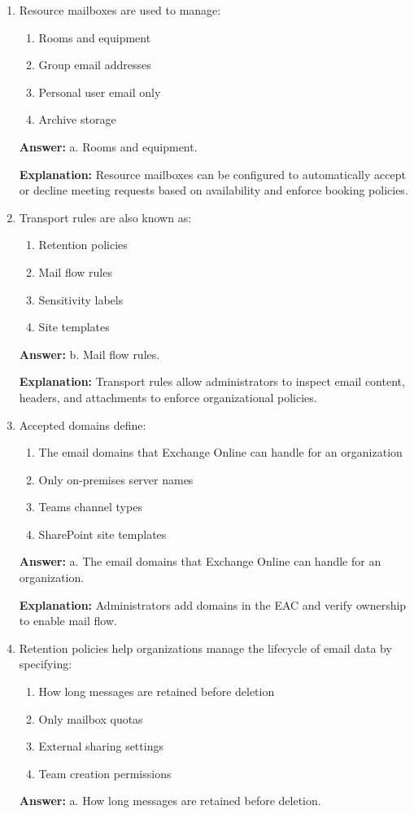 \documentclass[10pt]{article}
\begin{document}
\begin{enumerate}[leftmargin=*]
\textbf{Explanation:} Examples include support@contoso.com or info@contoso.com. These mailboxes don’t require a separate license unless accessed with mobile devices.

\item Resource mailboxes are used to manage:
\begin{enumerate}[label=\alph*., leftmargin=1.5em]
\item Rooms and equipment
\item Group email addresses
\item Personal user email only
\item Archive storage
\end{enumerate}
\textbf{Answer:} a. Rooms and equipment.

\textbf{Explanation:} Resource mailboxes can be configured to automatically accept or decline meeting requests based on availability and enforce booking policies.

\item Transport rules are also known as:
\begin{enumerate}[label=\alph*., leftmargin=1.5em]
\item Retention policies
\item Mail flow rules
\item Sensitivity labels
\item Site templates
\end{enumerate}
\textbf{Answer:} b. Mail flow rules.

\textbf{Explanation:} Transport rules allow administrators to inspect email content, headers, and attachments to enforce organizational policies.

\item Accepted domains define:
\begin{enumerate}[label=\alph*., leftmargin=1.5em]
\item The email domains that Exchange Online can handle for an organization
\item Only on-premises server names
\item Teams channel types
\item SharePoint site templates
\end{enumerate}
\textbf{Answer:} a. The email domains that Exchange Online can handle for an organization.

\textbf{Explanation:} Administrators add domains in the EAC and verify ownership to enable mail flow.

\item Retention policies help organizations manage the lifecycle of email data by specifying:
\begin{enumerate}[label=\alph*., leftmargin=1.5em]
\item How long messages are retained before deletion
\item Only mailbox quotas
\item External sharing settings
\item Team creation permissions
\end{enumerate}
\textbf{Answer:} a. How long messages are retained before deletion.


\end{enumerate}
\end{document}
